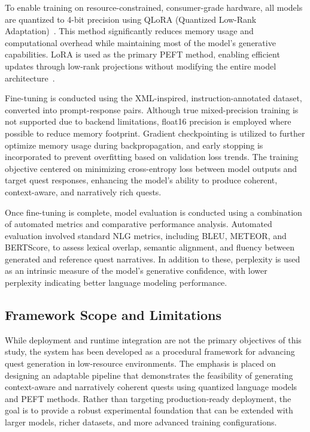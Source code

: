 To enable training on resource-constrained, consumer-grade hardware, all models are
quantized to 4-bit precision using QLoRA (Quantized Low-Rank Adaptation)~\cite{dettmers2023qlora}. This
method significantly reduces memory usage and computational overhead while maintaining
most of the model's generative capabilities. LoRA is used as the primary PEFT
method, enabling efficient updates through low-rank projections without modifying the
entire model architecture~\cite{peft,hu2022lora}.

Fine-tuning is conducted using the XML-inspired, instruction-annotated dataset, converted
into prompt-response pairs. Although true mixed-precision training is not supported
due to backend limitations, float16 precision is employed where possible to reduce
memory footprint. Gradient checkpointing is utilized to further optimize memory
usage during backpropagation, and early stopping is incorporated to prevent overfitting based
on validation loss trends. The training objective centered on minimizing cross-entropy
loss between model outputs and target quest responses, enhancing the model's ability to
produce coherent, context-aware, and narratively rich quests.

Once fine-tuning is complete, model evaluation is conducted using a combination of
automated metrics and comparative performance analysis. Automated evaluation involved
standard NLG metrics, including BLEU, METEOR, and BERTScore, to assess
lexical overlap, semantic alignment, and fluency between generated and reference quest
narratives. In addition to these, perplexity is used as an intrinsic measure of the model's
generative confidence, with lower perplexity indicating better language modeling performance.

\subsection{Framework Scope and Limitations}

While deployment and runtime integration are not the primary objectives of this study,
the system has been developed as a procedural framework for advancing quest generation
in low-resource environments. The emphasis is placed on designing an adaptable pipeline
that demonstrates the feasibility of generating context-aware and narratively coherent
quests using quantized language models and PEFT methods. Rather than targeting
production-ready deployment, the goal is to provide a robust experimental foundation
that can be extended with larger models, richer datasets, and more advanced training
configurations.

